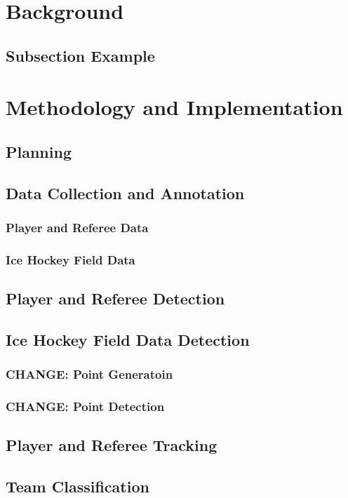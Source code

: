 \documentclass[12pt, letterpaper]{article}
\begin{document}
\section{Background}

\subsection{Subsection Example}
\newpage

\section{Methodology and Implementation}

\subsection{Planning}
\subsection{Data Collection and Annotation}
\subsubsection{Player and Referee Data}
\subsubsection{Ice Hockey Field Data}
\subsection{Player and Referee Detection}
\subsection{Ice Hockey Field Data Detection}
\subsubsection{\textbf{CHANGE}: Point Generatoin}
\subsubsection{\textbf{CHANGE}: Point Detection}
\subsection{Player and Referee Tracking}
\subsection{Team Classification}
\end{document}
